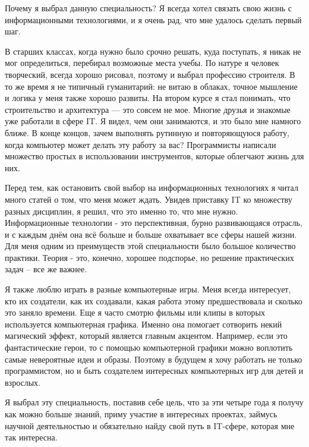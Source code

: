 Почему я выбрал данную специальность? Я всегда хотел связать свою жизнь с информационными технологиями, и я очень рад, что мне удалось 
сделать первый шаг.

В старших классах, когда нужно было срочно решать, куда поступать, я никак не мог определиться, перебирал возможные места учебы. По натуре я человек творческий, всегда хорошо рисовал, поэтому и выбрал профессию строителя. В то же время я не типичный гуманитарий: не витаю в облаках, точное мышление и логика у меня также хорошо развиты. На втором курсе я стал понимать, что строительство и архитектура --- это совсем не мое. Многие друзья и знакомые уже работали в сфере IT. Я видел, чем они занимаются, и это было мне намного ближе. В конце концов, зачем выполнять рутинную и повторяющуюся работу, когда компьютер может делать эту работу за вас? Программисты написали множество простых в использовании инструментов, которые облегчают жизнь для них.

Перед тем, как остановить свой выбор на информационных технологиях я читал много статей о том, что меня может ждать. Увидев приставку IT ко множеству разных дисциплин, я решил, что это именно то, что мне нужно. Информационные технологии - это перспективная, бурно развивающаяся отрасль, и с каждым днём она всё больше и больше охватывает все сферы нашей жизни. Для меня одним из преимуществ этой специальности было большое количество практики. Теория - это, конечно, хорошее подспорье, но решение практических задач – все же важнее.

Я также люблю играть в разные компьютерные игры. Меня всегда интересует, кто их создатели, как их создавали, какая работа этому предшествовала и сколько это заняло времени. Еще я часто смотрю фильмы или клипы в которых используется компьютерная графика. Именно она помогает сотворить некий магический эффект, который является главным акцентом. Например, если это фантастические герои, то с помощью компьютерной графики можно воплотить самые невероятные идеи и образы. Поэтому в будущем я хочу работать не только программистом, но и быть создателем интересных компьютерных игр для детей и взрослых.

Я выбрал эту специальность, поставив себе цель, что за эти четыре года я получу как можно больше знаний, приму участие в интересных проектах, займусь научной деятельностью и обязательно найду свой путь в IT-сфере, которая мне так интересна.